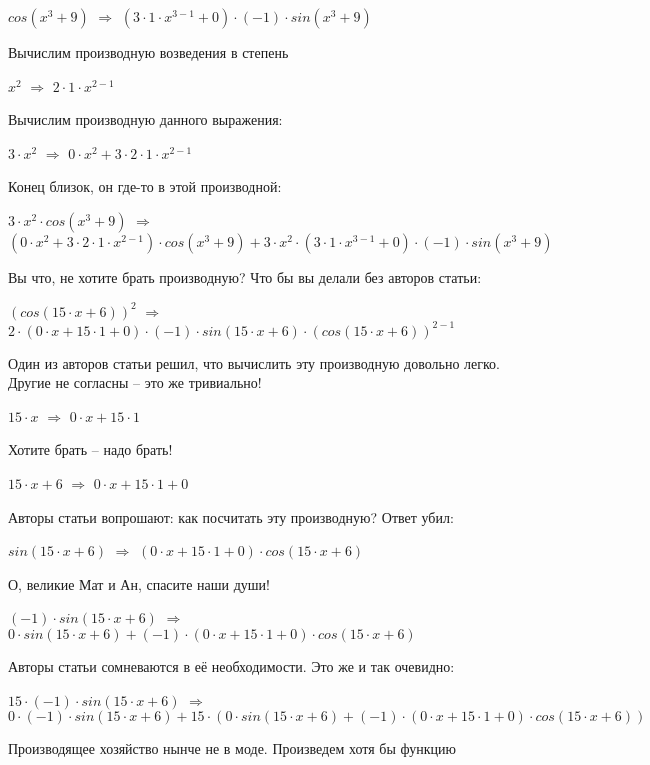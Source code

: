 \documentclass{article}
\begin{document}
$ cos (x ^ {3} + 9)$ $\Rightarrow$ $(3 \cdot 1 \cdot x ^ {3 - 1} + 0) \cdot (-1) \cdot  sin (x ^ {3} + 9)$

Вычислим производную возведения в степень

$x ^ {2}$ $\Rightarrow$ $2 \cdot 1 \cdot x ^ {2 - 1}$

Вычислим производную данного выражения:

$3 \cdot x ^ {2}$ $\Rightarrow$ $0 \cdot x ^ {2} + 3 \cdot 2 \cdot 1 \cdot x ^ {2 - 1}$

Конец близок, он где-то в этой производной:

$3 \cdot x ^ {2} \cdot  cos (x ^ {3} + 9)$ $\Rightarrow$ $(0 \cdot x ^ {2} + 3 \cdot 2 \cdot 1 \cdot x ^ {2 - 1}) \cdot  cos (x ^ {3} + 9) + 3 \cdot x ^ {2} \cdot (3 \cdot 1 \cdot x ^ {3 - 1} + 0) \cdot (-1) \cdot  sin (x ^ {3} + 9)$

Вы что, не хотите брать производную? Что бы вы делали без авторов статьи:

$( cos (15 \cdot x + 6)) ^ {2}$ $\Rightarrow$ $2 \cdot (0 \cdot x + 15 \cdot 1 + 0) \cdot (-1) \cdot  sin (15 \cdot x + 6) \cdot ( cos (15 \cdot x + 6)) ^ {2 - 1}$

Один из авторов статьи решил, что вычислить эту производную довольно легко. Другие не согласны -- это же тривиально!

$15 \cdot x$ $\Rightarrow$ $0 \cdot x + 15 \cdot 1$

Хотите брать -- надо брать!

$15 \cdot x + 6$ $\Rightarrow$ $0 \cdot x + 15 \cdot 1 + 0$

Авторы статьи вопрошают: как посчитать эту производную? Ответ убил:

$ sin (15 \cdot x + 6)$ $\Rightarrow$ $(0 \cdot x + 15 \cdot 1 + 0) \cdot  cos (15 \cdot x + 6)$

О, великие Мат и Ан, спасите наши души!

$(-1) \cdot  sin (15 \cdot x + 6)$ $\Rightarrow$ $0 \cdot  sin (15 \cdot x + 6) + (-1) \cdot (0 \cdot x + 15 \cdot 1 + 0) \cdot  cos (15 \cdot x + 6)$

Авторы статьи сомневаются в её необходимости. Это же и так очевидно:

$15 \cdot (-1) \cdot  sin (15 \cdot x + 6)$ $\Rightarrow$ $0 \cdot (-1) \cdot  sin (15 \cdot x + 6) + 15 \cdot (0 \cdot  sin (15 \cdot x + 6) + (-1) \cdot (0 \cdot x + 15 \cdot 1 + 0) \cdot  cos (15 \cdot x + 6))$

Производящее хозяйство нынче не в моде. Произведем хотя бы функцию
\end{document}
